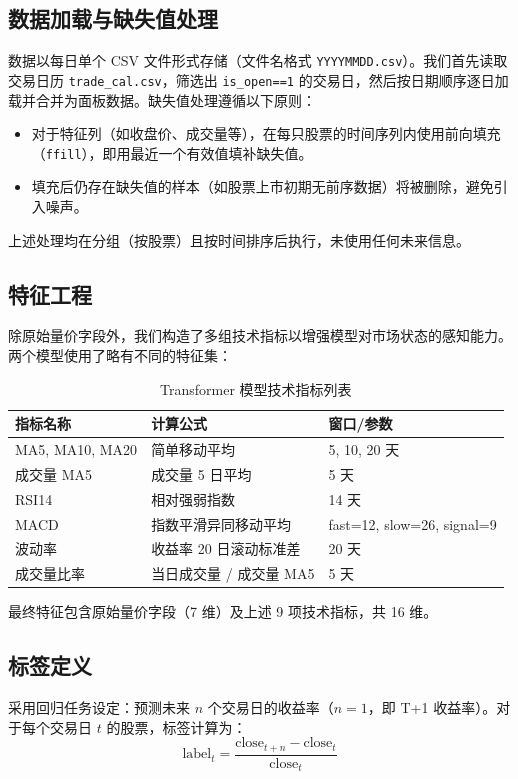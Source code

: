 \documentclass[12pt,a4paper]{ctexart}
\begin{document}
	\subsection{数据加载与缺失值处理}
	数据以每日单个 CSV 文件形式存储（文件名格式 \texttt{YYYYMMDD.csv}）。我们首先读取交易日历 \texttt{trade\_cal.csv}，筛选出 \texttt{is\_open==1} 的交易日，然后按日期顺序逐日加载并合并为面板数据。缺失值处理遵循以下原则：
	\begin{itemize}
		\item 对于特征列（如收盘价、成交量等），在每只股票的时间序列内使用前向填充（\texttt{ffill}），即用最近一个有效值填补缺失值。
		\item 填充后仍存在缺失值的样本（如股票上市初期无前序数据）将被删除，避免引入噪声。
	\end{itemize}
	上述处理均在分组（按股票）且按时间排序后执行，未使用任何未来信息。
	
	\subsection{特征工程}
	除原始量价字段外，我们构造了多组技术指标以增强模型对市场状态的感知能力。两个模型使用了略有不同的特征集：
	\begin{table}[H]
		\centering
		\caption{Transformer 模型技术指标列表}
		\label{tab:ta_transformer}
		\begin{tabular}{lll}
			\toprule
			指标名称 & 计算公式 & 窗口/参数 \\
			\midrule
			MA5, MA10, MA20 & 简单移动平均 & 5, 10, 20 天 \\
			成交量 MA5 & 成交量 5 日平均 & 5 天 \\
			RSI14 & 相对强弱指数 & 14 天 \\
			MACD & 指数平滑异同移动平均 & fast=12, slow=26, signal=9 \\
			波动率 & 收益率 20 日滚动标准差 & 20 天 \\
			成交量比率 & 当日成交量 / 成交量 MA5 & 5 天 \\
			\bottomrule
		\end{tabular}
	\end{table}
	最终特征包含原始量价字段（7 维）及上述 9 项技术指标，共 16 维。
	
	\subsection{标签定义}
	采用回归任务设定：预测未来 \(n\) 个交易日的收益率（\(n=1\)，即 T+1 收益率）。对于每个交易日 \(t\) 的股票，标签计算为：
	\[
	\text{label}_t = \frac{\text{close}_{t+n} - \text{close}_t}{\text{close}_t}
	\]
	
\end{document}
